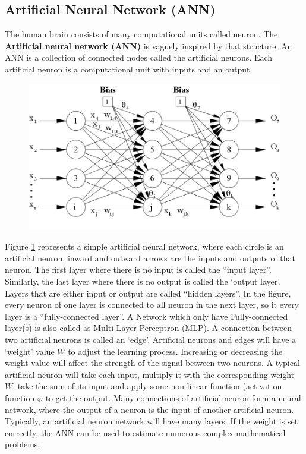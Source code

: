 \subsection{Artificial Neural Network (ANN)}
The human brain consists of many computational units called neuron. The \textbf{Artificial neural network (ANN)} is vaguely inspired by that structure. An ANN is a collection of connected nodes called the artificial neurons. Each artificial neuron is a computational unit with inputs and an output.
\begin{center}
	\begin{figure}[H]
		\centering
		\includegraphics[width=0.75\columnwidth]{images/chap2/NeuralNetwork.jpg}
		\label{chap2:neural_net}
	\end{figure}
\end{center}

Figure \ref{chap2:neural_net} represents a simple artificial neural network, where each circle is an artificial neuron, inward and outward arrows are the inputs and outputs of that neuron. The first layer where there is no input is called the “input layer”. Similarly, the last layer where there is no output is called the ‘output layer’. Layers that are either input or output are called “hidden layers”. In the figure, every neuron of one layer is connected to all neuron in the next layer, so it every layer is a “fully-connected layer”. A Network which only have Fully-connected layer(s) is also called as Multi Layer Perceptron (MLP). A connection between two artificial neurons is called an ‘edge’. Artificial neurons and edges will have a ‘weight’ value \boldmath$W$ to adjust the learning process. Increasing or decreasing the weight value will affect the strength of the signal between two neurons. A typical artificial neuron will take each input, multiply it with the corresponding weight \boldmath$W$, take the sum of its input and apply some non-linear function (activation function \boldmath$\varphi$ to get the output. Many connections of artificial neuron form a neural network, where the output of a neuron is the input of another artificial neuron. Typically, an artificial neuron network will have many layers. If the weight is set correctly, the ANN can be used to estimate numerous complex mathematical problems.

